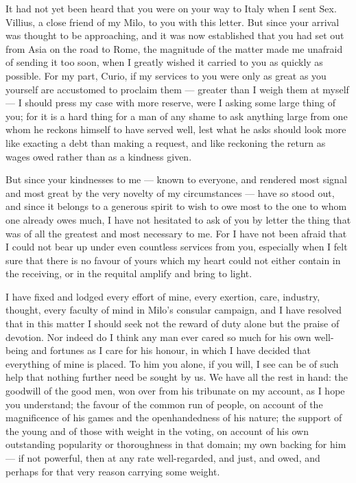 

 It had not yet been heard that you were on your way to Italy when I sent Sex. Villius, a close friend of my Milo, to you with this letter. But since your arrival was thought to be approaching, and it was now established that you had set out from Asia on the road to Rome, the magnitude of the matter made me unafraid of sending it too soon, when I greatly wished it carried to you as quickly as possible. For my part, Curio, if my services to you were only as great as you yourself are accustomed to proclaim them --- greater than I weigh them at myself --- I should press my case with more reserve, were I asking some large thing of you; for it is a hard thing for a man of any shame to ask anything large from one whom he reckons himself to have served well, lest what he asks should look more like exacting a debt than making a request, and like reckoning the return as wages owed rather than as a kindness given.

 But since your kindnesses to me --- known to everyone, and rendered most signal and most great by the very novelty of my circumstances --- have so stood out, and since it belongs to a generous spirit to wish to owe most to the one to whom one already owes much, I have not hesitated to ask of you by letter the thing that was of all the greatest and most necessary to me. For I have not been afraid that I could not bear up under even countless services from you, especially when I felt sure that there is no favour of yours which my heart could not either contain in the receiving, or in the requital amplify and bring to light.

 I have fixed and lodged every effort of mine, every exertion, care, industry, thought, every faculty of mind in Milo's consular campaign, and I have resolved that in this matter I should seek not the reward of duty alone but the praise of devotion. Nor indeed do I think any man ever cared so much for his own well-being and fortunes as I care for his honour, in which I have decided that everything of mine is placed. To him you alone, if you will, I see can be of such help that nothing further need be sought by us. We have all the rest in hand: the goodwill of the good men, won over from his tribunate on my account, as I hope you understand; the favour of the common run of people, on account of the magnificence of his games and the openhandedness of his nature; the support of the young and of those with weight in the voting, on account of his own outstanding popularity or thoroughness in that domain; my own backing for him --- if not powerful, then at any rate well-regarded, and just, and owed, and perhaps for that very reason carrying some weight.

